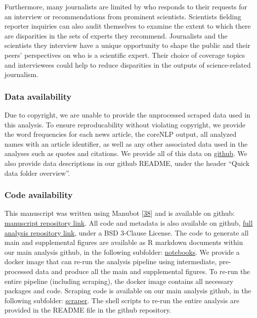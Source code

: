 Furthermore, many journalists are limited by who responds to their requests for an interview or recommendations from prominent scientists.
Scientists fielding reporter inquiries can also audit themselves to examine the extent to which there are disparities in the sets of experts they recommend.
Journalists and the scientists they interview have a unique opportunity to shape the public and their peers' perspectives on who is a scientific expert.
Their choice of coverage topics and interviewees could help to reduce disparities in the outputs of science-related journalism.

\hypertarget{data-availability}{%
\subsubsection{Data availability}\label{data-availability}}

Due to copyright, we are unable to provide the unprocessed scraped data used in this analysis.
To ensure reproducability without violating copyright, we provide the word frequencies for each news article, the coreNLP output, all analyzed names with an article identifier, as well as any other associated data used in the analyses such as quotes and citations.
We provide all of this data on \href{https://github.com/greenelab/nature_news_disparities/tree/main/data}{github}.
We also provide data descriptions in our github README, under the header ``Quick data folder overview''.

\hypertarget{code-availability}{%
\subsubsection{Code availability}\label{code-availability}}

This manuscript was written using Manubot {[}\protect\hyperlink{ref-YuJbg3zO}{38}{]} and is available on github: \href{https://github.com/greenelab/nature_news_manuscript}{manuscript repository link}.
All code and metadata is also available on github, \href{https://github.com/greenelab/nature_news_disparities}{full analysis repository link}, under a BSD 3-Clause License.
The code to generate all main and supplemental figures are available as R markdown documents within our main analysis github, in the following subfolder: \href{https://github.com/greenelab/nature_news_disparities/tree/main/figure_notebooks}{notebooks}.
We provide a docker image that can re-run the analysis pipeline using intermediate, pre-processed data and produce all the main and supplemental figures.
To re-run the entire pipeline (including scraping), the docker image contains all necessary packages and code.
Scraping code is available on our main analysis github, in the following subfolder: \href{https://github.com/greenelab/nature_news_disparities/tree/main/nature_news_scraper}{scraper}.
The shell scripts to re-run the entire analysis are provided in the README file in the github repository.


